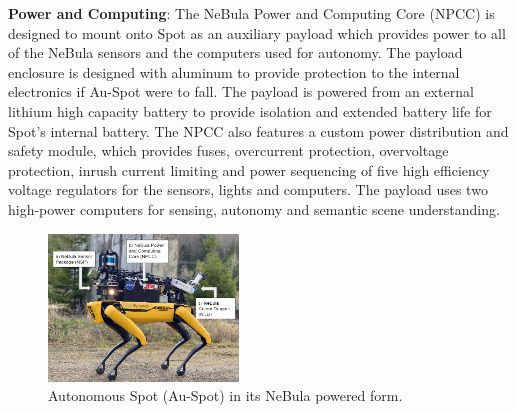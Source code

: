 \documentclass[letterpaper, 10pt, conference]{ieeeconf}      %
\newcommand{\ph}[1]{{\textbf{#1}:}} %
\newcommand{\rev}[1]{{\color{blue} #1 }} %
\begin{document}
\ph{Power and Computing}
The NeBula Power and Computing Core (NPCC) is designed to mount onto Spot as an auxiliary payload which provides power to all of the NeBula sensors and the computers used for autonomy. The payload enclosure is designed with aluminum to provide protection to the internal electronics if Au-Spot were to fall. 
The payload is powered from an external lithium high capacity battery to provide isolation and extended battery life for Spot's internal battery. 
The NPCC also features a custom power distribution and safety module, which provides fuses, overcurrent protection, overvoltage protection, inrush current limiting and power sequencing of five high efficiency voltage regulators for the sensors, lights and computers. %
The payload uses two high-power computers 
for sensing, autonomy and \rev{semantic scene}understanding.

\begin{figure}[t]
  \centering
  \includegraphics[width=0.45\textwidth]{graphics/spot_full_annotated_1.PNG}
  \caption{Autonomous Spot \rev{(Au-Spot)}in its 
  NeBula powered form.}
  \label{fig:spot_full_nebula_form}
\end{figure}

    
\end{document}
